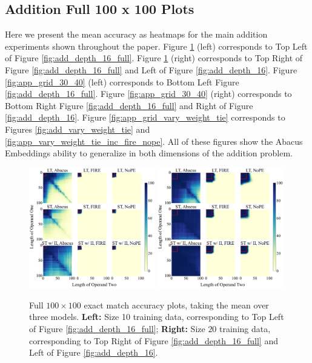 \documentclass{article}
\begin{document}
\subsection{Addition Full 100 x 100 Plots}
\label{app-subsec:grid-plots}
Here we present the mean accuracy as heatmaps for the main addition experiments shown throughout the paper.
Figure \ref{fig:app_grid_10_20} (left) corresponds to Top Left of Figure \ref{fig:add_depth_16_full}.
Figure \ref{fig:app_grid_10_20} (right) corresponds to Top Right of Figure \ref{fig:add_depth_16_full} and Left of Figure \ref{fig:add_depth_16}.
Figure \ref{fig:app_grid_30_40} (left) corresponds to Bottom Left Figure \ref{fig:add_depth_16_full}.
Figure \ref{fig:app_grid_30_40} (right) corresponds to Bottom Right Figure \ref{fig:add_depth_16_full} and Right of Figure \ref{fig:add_depth_16}.
Figure \ref{fig:app_grid_vary_weight_tie} corresponds to Figures \ref{fig:add_vary_weight_tie} and \ref{fig:app_vary_weight_tie_inc_fire_nope}.
All of these figures show the Abacus Embeddings ability to generalize in both dimensions of the addition problem.

\begin{figure}[ht!]
    \centering
    \includegraphics[width=0.49\textwidth]{Figures/grids/grids_plot_eight.pdf}
    \includegraphics[width=0.49\textwidth]{Figures/grids/grids_plot_one.pdf}
    \caption{
    Full $100\times 100$ exact match accuracy plots, taking the mean over three models.
    \textbf{Left:} Size 10 training data, corresponding to Top Left of Figure \ref{fig:add_depth_16_full}; \textbf{Right:} Size \(20\) training data, corresponding to Top Right of Figure \ref{fig:add_depth_16_full} and Left of Figure \ref{fig:add_depth_16}.
    }
    \label{fig:app_grid_10_20}
\end{figure}
\end{document}
